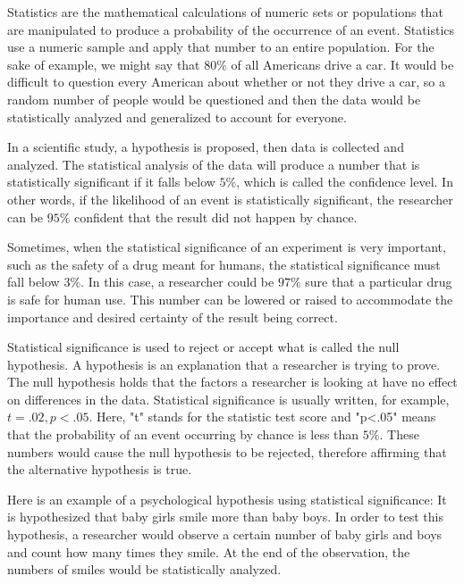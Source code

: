  

Statistics are the mathematical calculations of numeric sets or populations that are manipulated to produce a probability of the occurrence of an event. Statistics use a numeric sample and apply that number to an entire population. For the sake of example, we might say that $80\%$ of all Americans drive a car. It would be difficult to question every American about whether or not they drive a car, so a random number of people would be questioned and then the data would be statistically analyzed and generalized to account for everyone.

 

In a scientific study, a hypothesis is proposed, then data is collected and analyzed. The statistical analysis of the data will produce a number that is statistically significant if it falls below $5\%$, which is called the confidence level. In other words, if the likelihood of an event is statistically significant, the researcher can be $95\%$ confident that the result did not happen by chance.

 

Sometimes, when the statistical significance of an experiment is very important, such as the safety of a drug meant for humans, the statistical significance must fall below $3\%$. In this case, a researcher could be $97\%$ sure that a particular drug is safe for human use. This number can be lowered or raised to accommodate the importance and desired certainty of the result being correct.

 

Statistical significance is used to reject or accept what is called the null hypothesis. A hypothesis is an explanation that a researcher is trying to prove. The null hypothesis holds that the factors a researcher is looking at have no effect on differences in the data. Statistical significance is usually written, for example, $t=.02, p<.05$. Here, "t" stands for the statistic test score and "p<.05" means that the probability of an event occurring by chance is less than $5\%$. These numbers would cause the null hypothesis to be rejected, therefore affirming that the alternative hypothesis is true.

 

Here is an example of a psychological hypothesis using statistical significance: It is hypothesized that baby girls smile more than baby boys. In order to test this hypothesis, a researcher would observe a certain number of baby girls and boys and count how many times they smile. At the end of the observation, the numbers of smiles would be statistically analyzed.

